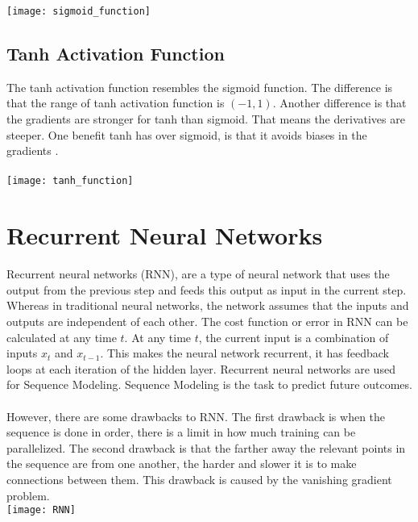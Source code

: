 \texttt{[image: sigmoid\_function]}

\pagebreak

\subsection{Tanh Activation Function}
The tanh activation function resembles the sigmoid function. The difference is that the range of tanh activation function is $(-1,1)$. Another difference is that the gradients are stronger for tanh than sigmoid. That means the derivatives are steeper. One benefit tanh has over sigmoid, is that it  avoids biases in the gradients \cite{Tan_h}.\\\\

\texttt{[image: tanh\_function]}

\section{Recurrent Neural Networks}
Recurrent neural networks (RNN), are a type of neural network that uses the output from the previous step and feeds this output as input in the current step. Whereas in traditional neural networks, the network assumes that the inputs and outputs are independent of each other. The cost function or error in RNN can be calculated at any time $t$. At any time $t$, the current input is a combination of inputs $x_t$ and $x_{t-1}$. This makes the neural network recurrent, it has feedback loops at each iteration of the hidden layer. Recurrent neural networks are used for Sequence Modeling. Sequence Modeling is the task to predict future outcomes. \\\\
However, there are some drawbacks to RNN. The first drawback is when the sequence is done in order, there is a limit in how much training can be parallelized. The second drawback is that the farther away the relevant points in the sequence are from one another, the harder and slower it is to make connections between them. This drawback is caused by the vanishing gradient problem.\\

\texttt{[image: RNN]}

